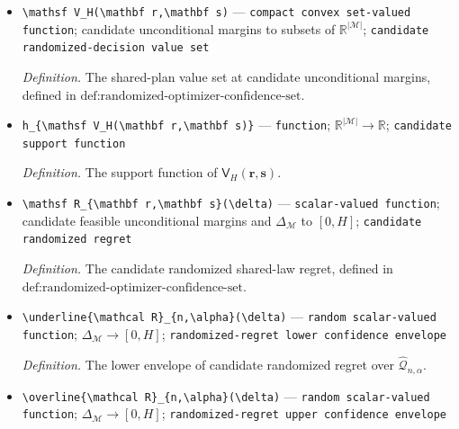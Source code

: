 \documentclass{article}
\begin{document}
\begin{itemize}
  \par\smallskip\noindent\emph{Definition.} \(\widehat{\mathcal Q}_{n,\alpha}=\operatorname{proj}_{\mathbf r,\mathbf s}\widehat{\mathcal P}_{n,\alpha}\).
  \item \texttt{\textbackslash{}\allowbreak{}mathsf V\_\allowbreak{}H(\textbackslash{}\allowbreak{}mathbf r,\allowbreak{}\textbackslash{}\allowbreak{}mathbf s)} --- \texttt{compact convex set-\allowbreak{}valued function}; candidate unconditional margins to subsets of \(\mathbb R^{|\mathcal M|}\); \texttt{candidate randomized-\allowbreak{}decision value set}
  \par\smallskip\noindent\emph{Definition.} The shared-plan value set at candidate unconditional margins, defined in \(\text{def:randomized-optimizer-confidence-set}\).
  \item \texttt{h\_\allowbreak{}\{\textbackslash{}\allowbreak{}mathsf V\_\allowbreak{}H(\textbackslash{}\allowbreak{}mathbf r,\allowbreak{}\textbackslash{}\allowbreak{}mathbf s)\}\allowbreak{}} --- \texttt{function}; \(\mathbb R^{|\mathcal M|}\to\mathbb R\); \texttt{candidate support function}
  \par\smallskip\noindent\emph{Definition.} The support function of \(\mathsf V_H(\mathbf r,\mathbf s)\).
  \item \texttt{\textbackslash{}\allowbreak{}mathsf R\_\allowbreak{}\{\textbackslash{}\allowbreak{}mathbf r,\allowbreak{}\textbackslash{}\allowbreak{}mathbf s\}\allowbreak{}(\textbackslash{}\allowbreak{}delta)} --- \texttt{scalar-\allowbreak{}valued function}; candidate feasible unconditional margins and \(\Delta_{\mathcal M}\) to \([0,H]\); \texttt{candidate randomized regret}
  \par\smallskip\noindent\emph{Definition.} The candidate randomized shared-law regret, defined in \(\text{def:randomized-optimizer-confidence-set}\).
  \item \texttt{\textbackslash{}\allowbreak{}underline\{\textbackslash{}\allowbreak{}mathcal R\}\allowbreak{}\_\allowbreak{}\{n,\allowbreak{}\textbackslash{}\allowbreak{}alpha\}\allowbreak{}(\textbackslash{}\allowbreak{}delta)} --- \texttt{random scalar-\allowbreak{}valued function}; \(\Delta_{\mathcal M}\to[0,H]\); \texttt{randomized-\allowbreak{}regret lower confidence envelope}
  \par\smallskip\noindent\emph{Definition.} The lower envelope of candidate randomized regret over \(\widehat{\mathcal Q}_{n,\alpha}\).
  \item \texttt{\textbackslash{}\allowbreak{}overline\{\textbackslash{}\allowbreak{}mathcal R\}\allowbreak{}\_\allowbreak{}\{n,\allowbreak{}\textbackslash{}\allowbreak{}alpha\}\allowbreak{}(\textbackslash{}\allowbreak{}delta)} --- \texttt{random scalar-\allowbreak{}valued function}; \(\Delta_{\mathcal M}\to[0,H]\); \texttt{randomized-\allowbreak{}regret upper confidence envelope}

\end{itemize}
\end{document}
